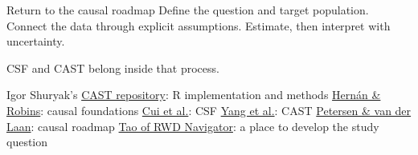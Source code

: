 \documentclass[aspectratio=169]{beamer}
\newcommand{\quiet}[1]{\par{\fontsize{17}{23}\selectfont\color{muted}#1\par}}
\newcommand{\gap}{\par\vspace{0.23in}}
\begin{document}
\begin{frame}{Return to the causal roadmap}
Define the question and target population.\newline
Connect the data through explicit assumptions.\newline
Estimate, then interpret with uncertainty.
\gap
{\color{teal}CSF and CAST belong inside that process.}
\gap
\quiet{Igor Shuryak's \href{https://github.com/ishuryak/cast_demo_website}{CAST repository}: R implementation and methods\newline
\href{https://miguelhernan.org/whatifbook}{Hern\'an \& Robins}: causal foundations \enspace\textperiodcentered\enspace
\href{https://doi.org/10.1093/jrsssb/qkac001}{Cui et al.}: CSF\newline
\href{https://arxiv.org/abs/2505.06367}{Yang et al.}: CAST \enspace\textperiodcentered\enspace
\href{https://doi.org/10.1097/EDE.0000000000000078}{Petersen \& van der Laan}: causal roadmap\newline
\href{https://navigator.tao-rwd.com/}{Tao of RWD Navigator}: a place to develop the study question}
\end{frame}
\end{document}
